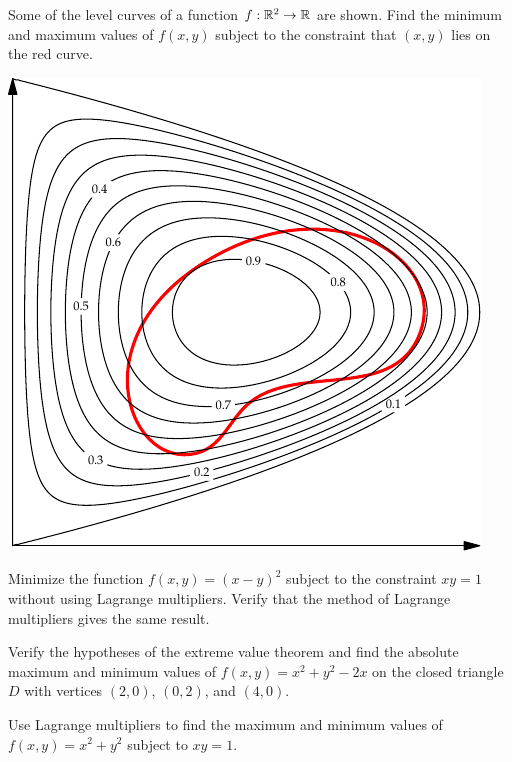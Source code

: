 \documentclass{watsonbook}
\begin{document}
\begin{aexercise}
  Some of the level curves of a function $f: \mathbb{R}^2 \to \mathbb{R}$ are
  shown. Find the minimum and maximum values of $f(x,y)$ subject to
  the constraint that $(x,y)$ lies on the red curve.
  \begin{center}
    \includegraphics{exercisefigures/lagrange_exercise} 
  \end{center}
\end{aexercise}

\begin{aexercise}
  Minimize the function $f(x,y) = (x-y)^2$ subject to the constraint
  $xy = 1$ without using Lagrange multipliers. Verify that the method
  of Lagrange multipliers gives the same result.
\end{aexercise}

\begin{aexercise}
  Verify the hypotheses of the extreme value theorem and find the
  absolute maximum and minimum values of $f(x,y) = x^2+y^2-2x$ on the
  closed triangle $D$ with vertices $(2,0)$, $(0,2)$, and $(4,0)$.
\end{aexercise}

\begin{aexercise}
  Use Lagrange multipliers to find the maximum and minimum values of
  $f(x,y) = x^2 + y^2$ subject to $xy = 1$.
\end{aexercise}
\end{document}
